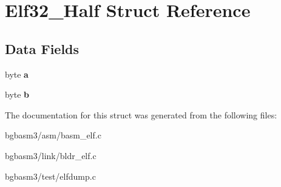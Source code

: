 \hypertarget{structElf32__Half}{\section{Elf32\-\_\-\-Half Struct Reference}
\label{structElf32__Half}
}
\subsection*{Data Fields}
\begin{DoxyCompactItemize}
\item 
\hypertarget{structElf32__Half_a942291fc93c5a6362db7c6d0fbda52df}{byte {\bfseries a}}\label{structElf32__Half_a942291fc93c5a6362db7c6d0fbda52df}

\item 
\hypertarget{structElf32__Half_a5d2ed469c8e39008d0733a0169473fae}{byte {\bfseries b}}\label{structElf32__Half_a5d2ed469c8e39008d0733a0169473fae}

\end{DoxyCompactItemize}


The documentation for this struct was generated from the following files\-:\begin{DoxyCompactItemize}
\item 
bgbasm3/asm/basm\-\_\-elf.\-c\item 
bgbasm3/link/bldr\-\_\-elf.\-c\item 
bgbasm3/test/elfdump.\-c\end{DoxyCompactItemize}
